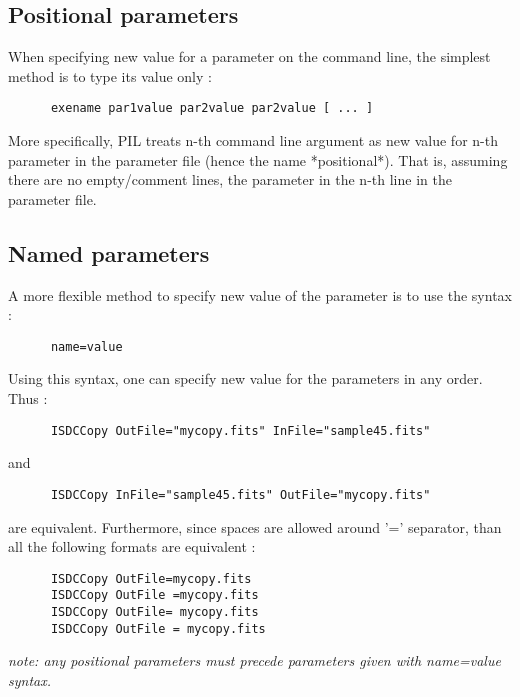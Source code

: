 \subsection{Positional parameters}\label{PILRefPositionalPar}

When specifying new value for a parameter on the command line, the
simplest method is to type its value only :

\begin{verbatim}
      exename par1value par2value par2value [ ... ]
\end{verbatim}

More specifically, PIL treats n-th command line argument as new value
for n-th parameter in the parameter file (hence the name *positional*). 
That is, assuming there are no empty/comment lines, the parameter in 
the n-th line in the parameter file.

\subsection{Named parameters}\label{PILRefNamedPar}

A more flexible method to specify new value of the parameter is to use
the syntax :

\begin{verbatim}
      name=value
\end{verbatim}

Using this syntax, one can specify new value for the parameters in any
order. Thus :

\begin{verbatim}
      ISDCCopy OutFile="mycopy.fits" InFile="sample45.fits"
\end{verbatim}

and

\begin{verbatim}
      ISDCCopy InFile="sample45.fits" OutFile="mycopy.fits"
\end{verbatim}

are equivalent. Furthermore, since spaces are allowed around '=' separator,
than all the following formats are equivalent :

\begin{verbatim}
      ISDCCopy OutFile=mycopy.fits
      ISDCCopy OutFile =mycopy.fits
      ISDCCopy OutFile= mycopy.fits
      ISDCCopy OutFile = mycopy.fits
\end{verbatim}

{\it note: any positional parameters must precede parameters given 
with name=value syntax.
}
